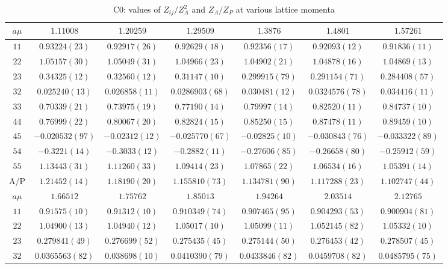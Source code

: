 \begin{table}
\begin{center}
\caption{C0: values of $Z_{ij}/Z_A^2$ and $Z_A/Z_P$ at various lattice momenta}
\begin{tabular}{c|c c c c c c}
\hline
\hline
$a\mu$ & $1.11008$ & $1.20259$ & $1.29509$ & $1.3876$ & $1.4801$ & $1.57261$ \\
\hline
$11$ & $0.93224(23)$ & $0.92917(26)$ & $0.92629(18)$ & $0.92356(17)$ & $0.92093(12)$ & $0.91836(11)$ \\
$22$ & $1.05157(30)$ & $1.05049(31)$ & $1.04966(23)$ & $1.04902(21)$ & $1.04878(16)$ & $1.04869(13)$ \\
$23$ & $0.34325(12)$ & $0.32560(12)$ & $0.31147(10)$ & $0.299915(79)$ & $0.291154(71)$ & $0.284408(57)$ \\
$32$ & $0.025240(13)$ & $0.026858(11)$ & $0.0286903(68)$ & $0.030481(12)$ & $0.0324576(78)$ & $0.034416(11)$ \\
$33$ & $0.70339(21)$ & $0.73975(19)$ & $0.77190(14)$ & $0.79997(14)$ & $0.82520(11)$ & $0.84737(10)$ \\
$44$ & $0.76999(22)$ & $0.80067(20)$ & $0.82824(15)$ & $0.85250(15)$ & $0.87478(11)$ & $0.89459(10)$ \\
$45$ & $-0.020532(97)$ & $-0.02312(12)$ & $-0.025770(67)$ & $-0.02825(10)$ & $-0.030843(76)$ & $-0.033322(89)$ \\
$54$ & $-0.3221(14)$ & $-0.3033(12)$ & $-0.2882(11)$ & $-0.27606(85)$ & $-0.26658(80)$ & $-0.25912(59)$ \\
$55$ & $1.13443(31)$ & $1.11260(33)$ & $1.09414(23)$ & $1.07865(22)$ & $1.06534(16)$ & $1.05391(14)$ \\
\hline
A/P & $1.21452(14)$ & $1.18190(20)$ & $1.155810(73)$ & $1.134781(90)$ & $1.117288(23)$ & $1.102747(44)$ \\
\hline
$a\mu$ & $1.66512$ & $1.75762$ & $1.85013$ & $1.94264$ & $2.03514$ & $2.12765$ \\
\hline
$11$ & $0.91575(10)$ & $0.91312(10)$ & $0.910349(74)$ & $0.907465(95)$ & $0.904293(53)$ & $0.900904(81)$ \\
$22$ & $1.04900(13)$ & $1.04940(12)$ & $1.05017(10)$ & $1.05099(11)$ & $1.052145(82)$ & $1.05332(10)$ \\
$23$ & $0.279841(49)$ & $0.276699(52)$ & $0.275435(45)$ & $0.275144(50)$ & $0.276453(42)$ & $0.278507(45)$ \\
$32$ & $0.0365563(82)$ & $0.038698(10)$ & $0.0410390(79)$ & $0.0433846(82)$ & $0.0459708(82)$ & $0.0485795(75)$ \\

\end{tabular}
\end{center}
\end{table}
